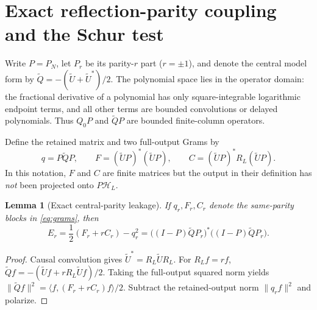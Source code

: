 \documentclass[11pt]{article}
\numberwithin{equation}{section}
\newtheorem{lemma}[theorem]{Lemma}
\theoremstyle{definition}
\theoremstyle{remark}
\newcommand{\HH}{\mathcal H}
\newcommand{\norm}[1]{\lVert#1\rVert}
\newcommand{\ip}[2]{\langle#1,#2\rangle}
\begin{document}
\section{Exact reflection-parity coupling and the Schur test}\label{sec:schur}

Write $P=P_N$, let $P_r$ be its parity-$r$ part ($r=\pm1$), and denote
the central model form by $\widetilde Q=-(\widetilde U+\widetilde U^*)/2$.
The polynomial space lies in the operator domain: the fractional derivative
of a polynomial has only square-integrable logarithmic endpoint terms,
and all other terms are bounded convolutions or delayed polynomials.
Thus $Q_0P$ and $\widetilde QP$ are bounded finite-column operators.

Define the retained matrix and two full-output Grams by
\begin{equation}\label{eq:grams}
 q=P\widetilde QP,\qquad
 F=(\widetilde UP)^*(\widetilde UP),\qquad
 C=(\widetilde UP)^*R_L(\widetilde UP).
\end{equation}
In this notation, $F$ and $C$ are finite matrices but the output in their
definition has \emph{not} been projected onto $P\HH_L$.

\begin{lemma}[Exact central-parity leakage]\label{lem:parity}
If $q_r,F_r,C_r$ denote the same-parity blocks in \eqref{eq:grams}, then
\begin{equation}\label{eq:leakage}
 E_r=\frac12(F_r+rC_r)-q_r^2
 =\bigl((I-P)\widetilde QP_r\bigr)^*
   \bigl((I-P)\widetilde QP_r\bigr).
\end{equation}
\end{lemma}
\begin{proof}
Causal convolution gives $\widetilde U^*=R_L\widetilde UR_L$.
For $R_Lf=rf$,
$\widetilde Qf=-(\widetilde Uf+rR_L\widetilde Uf)/2$.
Taking the full-output squared norm yields
$\norm{\widetilde Qf}^2=\ip f{(F_r+rC_r)f}/2$.
Subtract the retained-output norm $\norm{q_rf}^2$ and polarize.
\end{proof}
\end{document}
